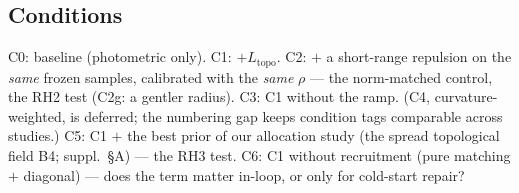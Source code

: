 \subsection{Conditions}
\label{sec:conditions}
C0: baseline (photometric only). C1: $+L_{\mathrm{topo}}$. C2: $+$ a
short-range repulsion on the \emph{same} frozen samples, calibrated with the
\emph{same} $\rho$ --- the norm-matched control, the RH2 test (C2g: a
gentler radius). C3: C1 without the ramp.
(C4, curvature-weighted, is deferred; the numbering gap keeps
condition tags comparable across studies.)
C5: C1 $+$ the best prior of our allocation study (the spread topological
field B4; suppl.\ \S A) --- the RH3 test.
C6: C1 without recruitment (pure matching $+$ diagonal) --- does the
term matter in-loop, or only for cold-start repair?
